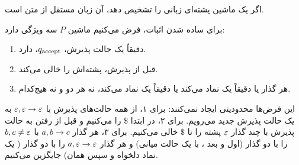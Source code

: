 \begin{lemma}\label{lem:pda-cfg}
اگر یک ماشین پشته‌ای زبانی را تشخیص دهد، آن زبان مستقل از متن است.
\end{lemma}

برای ساده شدن اثبات، فرض می‌کنیم ماشین $P$ سه ویژگی دارد:
\begin{enumerate}
\item دقیقاً یک حالت پذیرش، $q_{\mathrm{accept}}$، دارد.
\item قبل از پذیرش، پشته‌اش را خالی می‌کند.
\item هر گذار یا دقیقاً یک نماد  می‌کند یا دقیقاً یک نماد  می‌کند، نه هر دو و نه هیچ‌کدام.
\end{enumerate}
این فرض‌ها محدودیتی ایجاد نمی‌کنند: برای ۱، از همه حالت‌های پذیرش با $\varepsilon,\varepsilon\to\varepsilon$ به یک حالت پذیرش جدید می‌رویم. برای ۲، در ابتدا $\$$ را  می‌کنیم و قبل از رفتن به حالت پذیرش با چند گذار $\varepsilon$ پشته را تا $\$$ خالی می‌کنیم. برای ۳، هر گذار $a,b\to c$ با $b,c\neq\varepsilon$ را با دو گذار (اول  و بعد ، با یک حالت میانی) و هر گذار $a,\varepsilon\to\varepsilon$ را با دو گذار ( یک نماد دلخواه و سپس  همان) جایگزین می‌کنیم.

